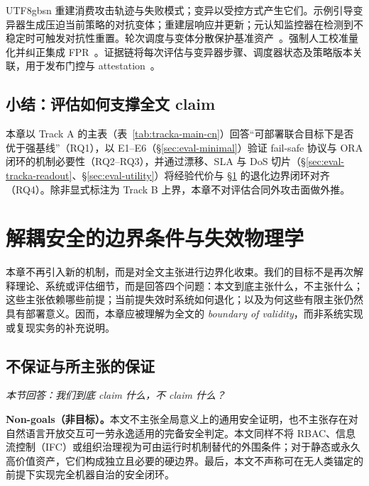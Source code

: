 \documentclass[letterpaper,twocolumn,10pt]{article}
\begin{document}
\begin{CJK}{UTF8}{gbsn}
重建消费攻击轨迹与失败模式；变异以受控方式产生它们。示例引导变异器生成压迫当前策略的对抗变体；重建层响应并更新；元认知监控器在检测到不稳定时可触发对抗性重置。轮次调度与变体分散保护基准资产~\cite{ControlledMutation_SafetyEval}。强制人工校准量化并纠正集成 FPR~\cite{tc260-governance}。证据链将每次评估与变异器步骤、调度器状态及策略版本关联，用于发布门控与 attestation~\cite{dual-use-attestations,ControlledMutation_SafetyEval}。

\subsection{小结：评估如何支撑全文 claim}
\label{sec:eval-summary}

本章以 Track A 的主表（表~\ref{tab:tracka-main-cn}）回答“可部署联合目标下是否优于强基线”（RQ1），以 E1--E6（\S\ref{sec:eval-minimal}）验证 fail-safe 协议与 ORA 闭环的机制必要性（RQ2--RQ3），并通过漂移、SLA 与 DoS 切片（\S\ref{sec:eval-tracka-readout}、\S\ref{sec:eval-utility}）将经验代价与 \S\ref{sec:physics} 的退化边界闭环对齐（RQ4）。除非显式标注为 Track B 上界，本章不对评估合同外攻击面做外推。

\section{解耦安全的边界条件与失效物理学}
\label{sec:physics}

本章不再引入新的机制，而是对全文主张进行边界化收束。我们的目标不是再次解释理论、系统或评估细节，而是回答四个问题：本文到底主张什么，不主张什么；这些主张依赖哪些前提；当前提失效时系统如何退化；以及为何这些有限主张仍然具有部署意义。因而，本章应被理解为全文的 \emph{boundary of validity}，而非系统实现或复现实务的补充说明。

\subsection{不保证与所主张的保证}
\label{sec:physics-claims}

\noindent\textit{本节回答：我们到底 claim 什么，不 claim 什么？}

\textbf{Non-goals（非目标）。}本文不主张全局意义上的通用安全证明，也不主张存在对自然语言开放交互可一劳永逸适用的完备安全判定。本文同样不将 RBAC、信息流控制（IFC）或组织治理视为可由运行时机制替代的外围条件；对于静态或永久高价值资产，它们构成独立且必要的硬边界。最后，本文不声称可在无人类锚定的前提下实现完全机器自治的安全闭环。


\end{CJK}
\end{document}
